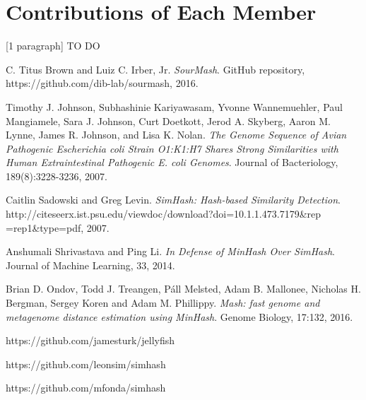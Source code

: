 \documentclass[12pt, letterpaper]{article}
\begin{document}
\section{Contributions of Each Member}
[1 paragraph] \color{red} TO DO \color{black}

\begin{thebibliography}{9}

  C. Titus Brown and Luiz C. Irber, Jr.
  \textit{SourMash}.
  GitHub repository, https://github.com/dib-lab/sourmash, 2016.
  
  Timothy J. Johnson, Subhashinie Kariyawasam, Yvonne Wannemuehler, Paul Mangiamele, Sara J. Johnson, Curt Doetkott, Jerod A. Skyberg, Aaron M. Lynne, James R. Johnson, and Lisa K. Nolan.
  \textit{The Genome Sequence of Avian Pathogenic Escherichia coli Strain O1:K1:H7 Shares Strong Similarities with Human Extraintestinal Pathogenic E. coli Genomes}.
  Journal of Bacteriology, 189(8):3228-3236, 2007.
  
  Caitlin Sadowski and Greg Levin.
  \textit{SimHash: Hash-based Similarity Detection}.
  http://citeseerx.ist.psu.edu/viewdoc/download?doi=10.1.1.473.7179\&rep\\=rep1\&type=pdf, 
  2007.

  Anshumali Shrivastava and Ping Li.
  \textit{In Defense of MinHash Over SimHash}.
  Journal of Machine Learning, 33, 2014.

  Brian D. Ondov, Todd J. Treangen, Páll Melsted, Adam B. Mallonee, Nicholas H. Bergman, Sergey Koren and Adam M. Phillippy.
  \textit{Mash: fast genome and metagenome distance estimation using MinHash}.
  Genome Biology, 17:132, 2016.
  
  https://github.com/jamesturk/jellyfish

  https://github.com/leonsim/simhash
  
  https://github.com/mfonda/simhash
  

\end{thebibliography}
\end{document}

